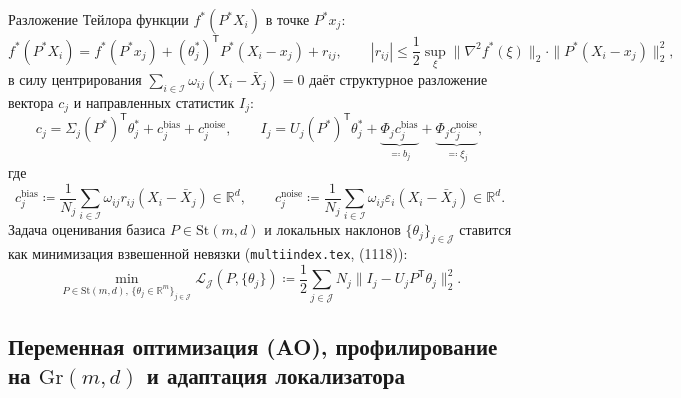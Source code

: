 \documentclass[11pt,a4paper]{article}
\newcommand{\R}{\mathbb{R}}
\newcommand{\T}{^{\mathsf{T}}}
\newcommand{\Gr}{\mathrm{Gr}}
\newcommand{\St}{\mathrm{St}}
\newcommand{\PEDRs}{P^{*}}
\newcommand{\LL}{\mathcal{L}}
\newcommand{\II}{\mathcal{I}}
\newcommand{\JJJ}{\mathcal{J}}
\theoremstyle{definition}
\theoremstyle{remark}
\begin{document}
Разложение Тейлора функции $f^*(\PEDRs X_i)$ в точке $\PEDRs x_j$:
\begin{equation}\label{eq:taylor_link}
    f^*(\PEDRs X_i) = f^*(\PEDRs x_j) + (\theta^*_j)\T \PEDRs(X_i - x_j) + r_{ij}, \qquad |r_{ij}| \le \frac{1}{2}\sup_{\xi}\|\nabla^2 f^*(\xi)\|_2 \cdot \|\PEDRs(X_i - x_j)\|_2^2,
\end{equation}
в силу центрирования $\sum_{i \in \II}\omega_{ij}(X_i - \bar{X}_j) = 0$ даёт структурное разложение вектора $c_j$ и направленных статистик $I_j$:
\begin{equation}\label{eq:I_decomp}
    c_j = \Sigma_j (\PEDRs)\T \theta^*_j + c_j^{\mathrm{bias}} + c_j^{\mathrm{noise}}, \qquad I_j = U_j (\PEDRs)\T \theta^*_j + \underbrace{\Phi_j c_j^{\mathrm{bias}}}_{\eqqcolon b_j} + \underbrace{\Phi_j c_j^{\mathrm{noise}}}_{\eqqcolon \xi_j},
\end{equation}
где
\begin{equation}\label{eq:cj_bias_noise}
    c_j^{\mathrm{bias}} \coloneqq \frac{1}{N_j}\sum_{i \in \II} \omega_{ij} r_{ij} (X_i - \bar{X}_j) \in \R^d, \qquad c_j^{\mathrm{noise}} \coloneqq \frac{1}{N_j}\sum_{i \in \II} \omega_{ij} \varepsilon_i (X_i - \bar{X}_j) \in \R^d.
\end{equation}
Задача оценивания базиса $P \in \St(m,d)$ и локальных наклонов $\{\theta_j\}_{j \in \JJJ}$ ставится как минимизация взвешенной невязки (\texttt{multiindex.tex}, (1118)):
\begin{equation}\label{eq:adp_objective}
    \min_{P \in \St(m,d), \, \{\theta_j \in \R^m\}_{j \in \JJJ}} \LL_{\JJJ}(P, \{\theta_j\}) \coloneqq \frac{1}{2}\sum_{j \in \JJJ} N_j \bigl\|I_j - U_j P\T \theta_j\bigr\|_2^2.
\end{equation}

\subsection{Переменная оптимизация (AO), профилирование на $\Gr(m,d)$ и адаптация локализатора}
\end{document}
